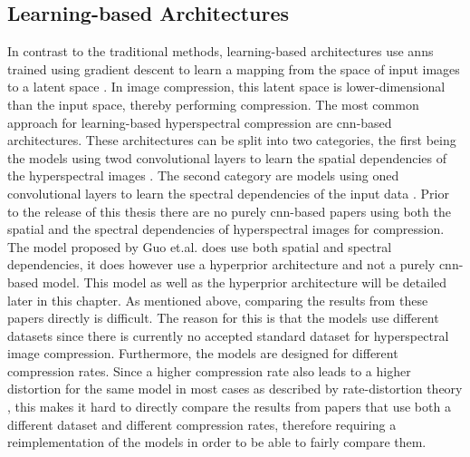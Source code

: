 \subsection{Learning-based Architectures}
In contrast to the traditional methods, learning-based architectures use \acp{ann} trained using gradient descent to learn a mapping from the space of input images to a latent space \citep{ruder_overview_2017}. In image compression, this latent space is lower-dimensional than the input space, thereby performing compression. 
The most common approach for learning-based hyperspectral compression are \ac{cnn}-based architectures. These architectures can be split into two categories, the first being the models using \ac{twod} convolutional layers to learn the spatial dependencies of the hyperspectral images \citep{la_grassa_hyperspectral_2022}. The second category are models using \ac{oned} convolutional layers to learn the spectral dependencies of the input data \citep{kuester_1d-convolutional_2021,kuester_transferability_2022}. Prior to the release of this thesis there are no purely \ac{cnn}-based papers using both the spatial and the spectral dependencies of hyperspectral images for compression. The model proposed by Guo et.al. \citep{guo_learned_2021} does use both spatial and spectral dependencies, it does however use a hyperprior architecture and not a purely \ac{cnn}-based model. This model as well as the hyperprior architecture will be detailed later in this chapter.
As mentioned above, comparing the results from these papers directly is difficult. The reason for this is that the models use different datasets since there is currently no accepted standard dataset for hyperspectral image compression. Furthermore, the models are designed for different compression rates. Since a higher compression rate also leads to a higher distortion for the same model in most cases as described by rate-distortion theory \citep{berger_rate-distortion_2003}, this makes it hard to directly compare the results from papers that use both a different dataset and different compression rates, therefore requiring a reimplementation of the models in order to be able to fairly compare them.

